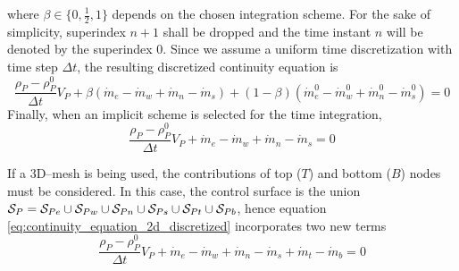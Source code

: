 where $\beta \in \{ 0, \frac{1}{2}, 1 \}$ depends on the chosen integration
scheme. For the sake of simplicity, superindex $n+1$ shall be dropped and the
time instant $n$ will be denoted by the superindex $0$. Since we assume a
uniform time discretization with time step $\Delta t$, the resulting discretized
continuity equation is
\begin{equation}
	\frac{\rho_P - \rho_P^0}{\Delta t} V_P 
	+ \beta (\dot{m}_e - \dot{m}_w + \dot{m}_n - \dot{m}_s)
	+ (1 - \beta) (\dot{m}_e^0 - \dot{m}_w^0 + \dot{m}_n^0 - \dot{m}_s^0) = 0
\end{equation}
Finally, when an implicit scheme is selected for the time integration,
\begin{equation} \label{eq:continuity_equation_2d_discretized}
	\frac{\rho_P - \rho_P^0}{\Delta t} V_P + 
	\dot{m}_e - \dot{m}_w + 
	\dot{m}_n - \dot{m}_s = 0
\end{equation}

If a 3D--mesh is being used, the contributions of top ($T$) and bottom ($B$) nodes must be
considered. In this case, the control surface is the union $\mathcal{S}_{P} = \mathcal{S}_{Pe} \cup \mathcal{S}_{Pw} \cup
\mathcal{S}_{Pn} \cup \mathcal{S}_{Ps} \cup \mathcal{S}_{Pt} \cup \mathcal{S}_{Pb}$, hence equation
\eqref{eq:continuity_equation_2d_discretized} incorporates two new terms
\begin{equation} \label{eq:continuity_equation_3d_discretized}
	\frac{\rho_P - \rho_P^0}{\Delta t} V_P + 
	\dot{m}_e - \dot{m}_w + \dot{m}_n - \dot{m}_s + \dot{m}_t - \dot{m}_b = 0
\end{equation}
